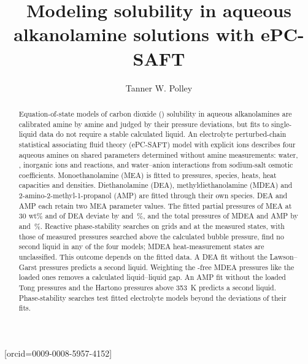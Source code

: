 \documentclass[a4paper,fleqn]{cas-sc}
\begin{document}
\let\WriteBookmarks\relax
\def\floatpagepagefraction{1}
\def\textpagefraction{.001}


\title[mode = title]{\texorpdfstring{Modeling  solubility in aqueous alkanolamine solutions with ePC-SAFT}{Modeling CO2 solubility in aqueous alkanolamine solutions with ePC-SAFT}}

\author[1]{Tanner W. Polley}[orcid=0009-0008-5957-4152]
\cormark[1]



\begin{abstract}
Equation-of-state models of carbon dioxide (\COtwo) solubility in aqueous alkanolamines are calibrated amine by amine and judged by their pressure deviations, but fits to single-liquid data do not require a stable calculated liquid.
An electrolyte perturbed-chain statistical associating fluid theory (ePC-SAFT) model with explicit ions describes four aqueous amines on shared parameters determined without amine measurements: water, \COtwo, inorganic ions and reactions, and water--anion interactions from sodium-salt osmotic coefficients.
Monoethanolamine (MEA) is fitted to pressures, species, heats, heat capacities and densities.
Diethanolamine (DEA), methyldiethanolamine (MDEA) and 2-amino-2-methyl-1-propanol (AMP) are fitted through their own species.
DEA and AMP each retain two MEA parameter values.
The fitted \COtwo partial pressures of MEA at 30 wt\% and of DEA deviate by  and \,\%, and the total pressures of MDEA and AMP by  and \,\%.
Reactive phase-stability searches on grids and at the measured states, with those of measured pressures searched above the calculated bubble pressure, find no second liquid in any of the four models;  MDEA heat-measurement states are unclassified.
This outcome depends on the fitted data.
A DEA fit without the Lawson--Garst pressures predicts a second liquid.
Weighting the \COtwo-free MDEA pressures like the loaded ones removes a calculated liquid--liquid gap.
An AMP fit without the loaded Tong pressures and the Hartono pressures above \SI{353}{\kelvin} predicts a second liquid.
Phase-stability searches test fitted electrolyte models beyond the deviations of their fits.

\end{abstract}
\end{document}

